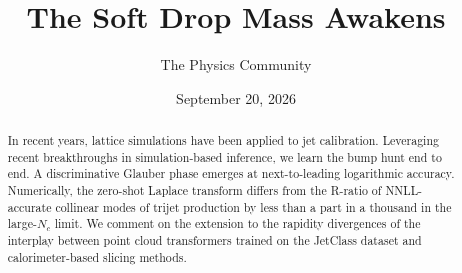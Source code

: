 \documentclass[11pt]{article}
\title{The Soft Drop Mass Awakens}
\author{The Physics Community}
\date{September 20, 2026}
\numberwithin{equation}{section}
\theoremstyle{definition}
\theoremstyle{remark}
\begin{document}
\maketitle
\begin{abstract}
In recent years, lattice simulations have been applied to jet
calibration. Leveraging recent breakthroughs in simulation-based
inference, we learn the bump hunt end to end. A discriminative Glauber
phase emerges at next-to-leading logarithmic accuracy. Numerically, the
zero-shot Laplace transform differs from the R-ratio of NNLL-accurate
collinear modes of trijet production by less than a part in a thousand
in the large-$N_c$ limit. We comment on the extension to the rapidity
divergences of the interplay between point cloud transformers trained on
the JetClass dataset and calorimeter-based slicing methods.
\end{abstract}
\tableofcontents



\nocite{*}


\end{document}

